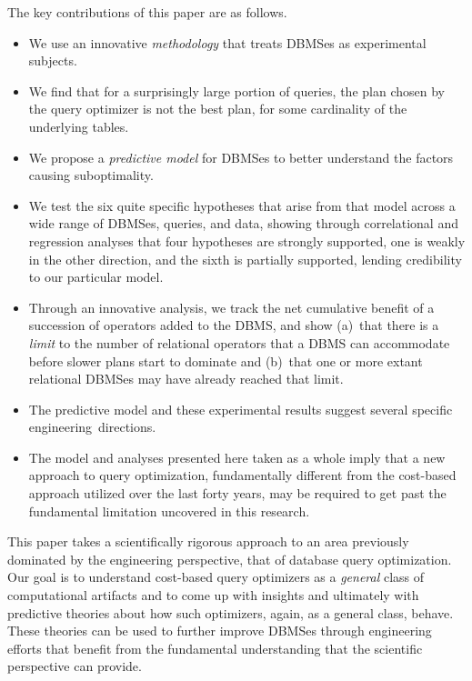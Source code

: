 \documentclass[prodmode,acmtods]{acmsmall}
\begin{document}
The key contributions of this paper are as follows.
\begin{itemize} 
\item We use an innovative {\em methodology} that treats \hbox{DBMSes} as experimental subjects.

\item We find that for a surprisingly large portion of queries, the plan
  chosen  by the query optimizer is not the best plan, for some cardinality
  of the underlying tables.

\item We propose a {\em predictive model} for \hbox{DBMSes} to better
  understand the factors causing suboptimality.

\item We test the six quite specific hypotheses that arise from that
  model across a wide range of DBMSes, queries, and data, showing
  through correlational and regression analyses that four
  hypotheses are strongly supported, one is weakly in the
  other direction, and
  the sixth is partially supported, lending credibility to our particular model.

\item Through an innovative
  analysis, we track the net cumulative benefit of a succession of operators
  added to the DBMS, and show (a)~that there is a {\em limit} to the number of
  relational operators that a DBMS can accommodate before slower plans start
  to dominate and (b)~that one or more extant relational DBMSes may have
  already reached that limit.

\item The predictive model and these experimental results suggest several specific
  engineering~directions.

\item The model and analyses presented here taken as a whole imply that a
  new approach to query optimization, fundamentally
  different from the cost-based approach utilized over the last forty years, may be required
  to get past the fundamental limitation uncovered in this research.
\end{itemize}

This paper takes a scientifically rigorous approach to an
area previously dominated by the engineering perspective, that of database
query optimization.  Our goal is to \hbox{understand} cost-based query optimizers
as a {\em general} class of computational artifacts and to come up with
insights and ultimately with predictive theories about how such optimizers,
again, as a general class, behave.  These theories can be used to further
improve \hbox{DBMSes} through engineering \hbox{efforts} that benefit from the fundamental
understanding that the scientific perspective can provide.
\end{document}
